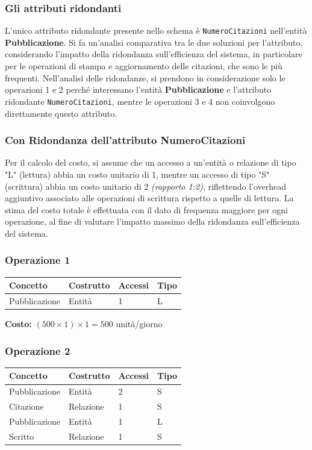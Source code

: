 \documentclass[a4paper,12pt]{article}
\begin{document}
\subsubsection{Gli attributi ridondanti}
L'unico attributo ridondante presente nello schema è \texttt{NumeroCitazioni} nell'entità \textbf{Pubblicazione}. Si fa un'analisi comparativa tra le due soluzioni per l'attributo, considerando l'impatto della ridondanza sull'efficienza del sistema, in particolare per le operazioni di stampa e aggiornamento delle citazioni, che sono le più frequenti. Nell'analisi delle ridondanze, si prendono in considerazione solo le operazioni 1 e 2 perché interessano l'entità \textbf{Pubblicazione} e l'attributo ridondante \texttt{NumeroCitazioni}, mentre le operazioni 3 e 4 non coinvolgono direttamente questo attributo.
\subsubsection{Con Ridondanza dell'attributo NumeroCitazioni} 
Per il calcolo del costo, si assume che un accesso a un'entità o relazione di tipo "L" (lettura) abbia un costo unitario di 1, mentre un accesso di tipo "S" (scrittura) abbia un costo unitario di 2 \textit{(rapporto 1:2)}, riflettendo l'overhead aggiuntivo associato alle operazioni di scrittura rispetto a quelle di lettura. 
La stima del costo totale è effettuata con il dato di frequenza maggiore per ogni operazione, al fine di valutare l'impatto massimo della ridondanza sull'efficienza del sistema.
\subsubsection*{Operazione 1}
\begin{tabular}{llll}
\toprule
\textbf{Concetto} & \textbf{Costrutto} & \textbf{Accessi} & \textbf{Tipo} \\
\midrule
Pubblicazione & Entità & 1 & L \\
\bottomrule
\end{tabular}

\medskip
\textbf{Costo:} $(500 \times 1) \times 1 = 500$ unità/giorno

\subsubsection*{Operazione 2}
\begin{tabular}{llll}
\toprule
\textbf{Concetto} & \textbf{Costrutto} & \textbf{Accessi} & \textbf{Tipo} \\
\midrule
Pubblicazione & Entità & 2 & S \\
Citazione          & Relazione & 1 & S \\
Pubblicazione & Entità & 1 & L \\
Scritto        & Relazione & 1 & S \\
\bottomrule
\end{tabular}
\end{document}
